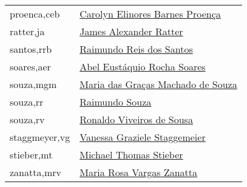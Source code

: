 \begin{longtable}{l l}
proenca,ceb         & \hyperlink{http://lattes.cnpq.br/8243382046974477}{Carolyn Elinores Barnes Proença} \\
ratter,ja           & \hyperlink{https://plants.jstor.org/stable/10.5555/al.ap.person.bm000023562}{James Alexander Ratter} \\
santos,rrb          & \hyperlink{https://plants.jstor.org/stable/10.5555/al.ap.person.bm000032907}{Raimundo Reis dos Santos} \\
soares,aer          & \hyperlink{http://lattes.cnpq.br/4908757546415140}{Abel Eustáquio Rocha Soares} \\
souza,mgm           & \hyperlink{http://lattes.cnpq.br/2817470874123772}{Maria das Graças Machado de Souza} \\
souza,rr            & \hyperlink{https://plants.jstor.org/stable/10.5555/al.ap.person.bm000055998 }{Raimundo Souza} \\
souza,rv            & \hyperlink{http://lattes.cnpq.br/2008471425847512}{Ronaldo Viveiros de Sousa} \\
staggmeyer,vg       & \hyperlink{http://lattes.cnpq.br/4357034543526737}{Vanessa Graziele Staggemeier} \\
stieber,mt          & \hyperlink{https://plants.jstor.org/stable/10.5555/al.ap.person.bm000010969}{Michael Thomas Stieber} \\
zanatta,mrv         & \hyperlink{http://lattes.cnpq.br/5981278331253704}{Maria Rosa Vargas Zanatta} \\
      \hline
\end{longtable}